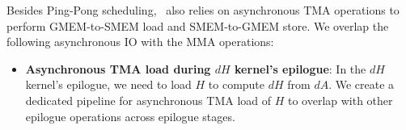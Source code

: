 
Besides Ping-Pong scheduling, \Algname~also relies on asynchronous TMA operations to perform GMEM-to-SMEM load and SMEM-to-GMEM store. We overlap the following asynchronous IO with the MMA operations:

\begin{itemize}[noitemsep]
    \item \textbf{Asynchronous TMA load during $dH$ kernel's epilogue}: In the $dH$ kernel's epilogue, we need to load $H$ to compute $dH$ from $dA$. We create a dedicated pipeline for asynchronous TMA load of $H$ to overlap with other epilogue operations across epilogue stages. 
    


\end{itemize}
